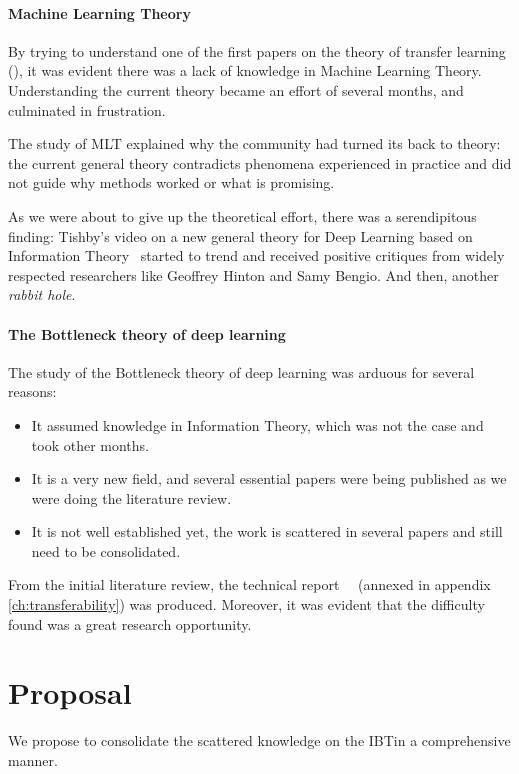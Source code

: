\paragraph{Machine Learning Theory} By trying to understand one of the first papers on the theory of transfer learning (\citeauthor{baxter:2000}), it was evident there was a lack of knowledge in Machine Learning Theory. Understanding the current theory became an effort of several months, and culminated in frustration.

The study of \ac{MLT} explained why the community had turned its back to theory: the current general theory contradicts phenomena experienced in practice and did not guide why methods worked or what is promising.

As we were about to give up the theoretical effort, there was a serendipitous finding: Tishby's video on a new general theory for Deep Learning based on Information Theory~\cite{tishby:2017} started to trend and received positive critiques from widely respected researchers like Geoffrey Hinton and Samy Bengio. And then, another \emph{rabbit hole}.

\paragraph{The Bottleneck theory of deep learning} The study of the Bottleneck theory of deep learning was arduous for several reasons:
\begin{itemize}
	\item It assumed knowledge in Information Theory, which was not the case and took other months.
	\item It is a very new field, and several essential papers were being published as we were doing the literature review.
	\item It is not well established yet, the work is scattered in several papers and still need to be consolidated.
\end{itemize}
From the initial literature review, the technical report~~\cite{guth:2019transferability} (annexed in appendix \cref{ch:transferability}) was produced. Moreover, it was evident that the difficulty found was a great research opportunity.


\section{Proposal} We propose to consolidate the scattered knowledge on the \acf{IBT}in a comprehensive manner.

